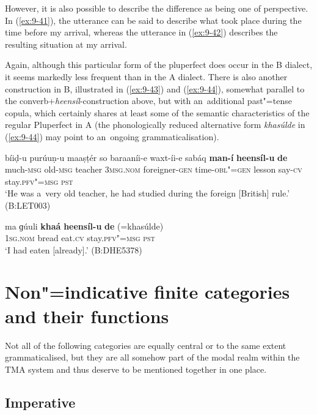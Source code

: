 However, it is also possible to describe the difference as being one of perspective. In (\ref{ex:9-41}), the utterance can be said to describe what took place during the time before my arrival, whereas the utterance in (\ref{ex:9-42}) describes the resulting situation at my arrival.


Again, although this particular form of the pluperfect does occur in the B dialect, it seems markedly less frequent than in the A dialect. There is also another construction in B, illustrated in (\ref{ex:9-43}) and (\ref{ex:9-44}), somewhat parallel to the converb+\textit{heensíl}-construction above, but with an~additional past"=tense copula, which certainly shares at least some of the semantic characteristics of the regular Pluperfect in A (the phonologically reduced alternative form \textit{khasúlde} in (\ref{ex:9-44}) may point to an~ongoing grammaticalisation).

\begin{exe}
\ex
\label{ex:9-43}
\gll bíiḍ-u purúuṇ-u maaṣṭér so baraaníi-e waxt-íi-e sabáq \textbf{man-í} \textbf{heensíl-u} \textbf{de} \\
much-\textsc{msg} old-\textsc{msg} teacher 3\textsc{msg.nom}  foreigner-\textsc{gen}
time-\textsc{obl"=gen} lesson say-\textsc{cv} stay.\textsc{pfv"=msg} \textsc{pst} \\
\glt `He was a~very old teacher, he had studied during the foreign [British] rule.' (B:LET003)

\ex
\label{ex:9-44}
\gll ma ɡúuli \textbf{khaá} \textbf{heensíl-u} \textbf{de} (=khasúlde) \\
\textsc{1sg.nom} bread eat.\textsc{cv} stay.\textsc{pfv"=msg} \textsc{pst}  \\
\glt `I had eaten [already].' (B:DHE5378)
\end{exe}

\section{Non"=indicative finite categories and their functions}
\label{sec:9-2}


Not all of the following categories are equally central or to the same extent grammaticalised, but they are all somehow part of the modal realm within the TMA system and thus deserve to be mentioned together in one place.


\subsection{Imperative}
\label{subsec:9-2-1}

